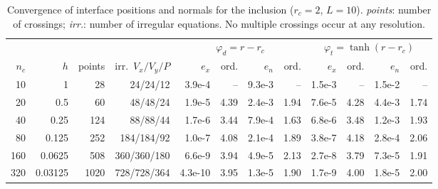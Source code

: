 \documentclass[11pt,a4paper]{article}
\begin{document}
\begin{table}[h]
\centering
\small
\begin{tabular}{@{}rrrr rr rr rr rr@{}}
\toprule
& & & & \multicolumn{4}{c}{$\varphi_d=r-r_c$} & \multicolumn{4}{c}{$\varphi_t=\tanh(r-r_c)$}\\
\cmidrule(lr){5-8}\cmidrule(l){9-12}
$n_c$ & $h$ & points & irr.\ $V_x/V_y/P$ & $e_x$ & ord. & $e_n$ & ord. & $e_x$ & ord. & $e_n$ & ord.\\
\midrule
 10 & 1      &   28 & 24/24/12    & 3.9e-4  & --   & 9.3e-3 & --   & 1.5e-3 & --   & 1.5e-2 & --   \\
 20 & 0.5    &   60 & 48/48/24    & 1.9e-5  & 4.39 & 2.4e-3 & 1.94 & 7.6e-5 & 4.28 & 4.4e-3 & 1.74 \\
 40 & 0.25   &  124 & 88/88/44    & 1.7e-6  & 3.44 & 7.9e-4 & 1.63 & 6.8e-6 & 3.48 & 1.2e-3 & 1.93 \\
 80 & 0.125  &  252 & 184/184/92  & 1.0e-7  & 4.08 & 2.1e-4 & 1.89 & 3.8e-7 & 4.18 & 2.8e-4 & 2.06 \\
160 & 0.0625 &  508 & 360/360/180 & 6.6e-9  & 3.94 & 4.9e-5 & 2.13 & 2.7e-8 & 3.79 & 7.3e-5 & 1.91 \\
320 & 0.03125& 1020 & 728/728/364 & 4.3e-10 & 3.95 & 1.3e-5 & 1.90 & 1.7e-9 & 4.00 & 1.8e-5 & 2.00 \\
\bottomrule
\end{tabular}
\caption{Convergence of interface positions and normals for the inclusion ($r_c=2$, $L=10$).
\emph{points}: number of crossings; \emph{irr.}: number of irregular equations.
No multiple crossings occur at any resolution.}
\label{tab:conv}
\end{table}
\end{document}
